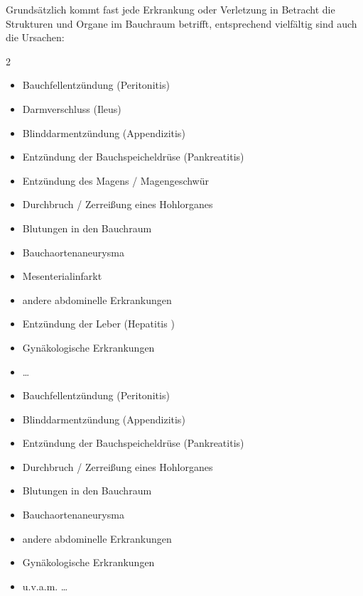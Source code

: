 {
Grundsätzlich kommt fast jede Erkrankung oder Verletzung in
Betracht die Strukturen und Organe im Bauchraum betrifft,
entsprechend vielfältig sind auch die Ursachen: 

\begin{multicols}{2}
\begin{itemize}
  \item Bauchfellentzündung (Peritonitis)
  \item Darmverschluss (Ileus)
  \item Blinddarmentzündung (Appendizitis)
  \item Entzündung der Bauchspeicheldrüse  (Pankreatitis)
  \item Entzündung des Magens / Magengeschwür
  \item Durchbruch / Zerreißung eines Hohlorganes
  \item Blutungen in den Bauchraum
  \item Bauchaortenaneurysma
  \item Mesenterialinfarkt
  \item andere abdominelle Erkrankungen
  \item Entzündung der Leber (Hepatitis )
  \item Gynäkologische Erkrankungen
  \item \ldots
\end{itemize}
\end{multicols}
}{
\begin{itemize}
  \item Bauchfellentzündung (Peritonitis)
  \item Blinddarmentzündung (Appendizitis)
  \item Entzündung der Bauchspeicheldrüse  (Pankreatitis)
  \item Durchbruch / Zerreißung eines Hohlorganes
  \item Blutungen in den Bauchraum
  \item Bauchaortenaneurysma
  \item andere abdominelle Erkrankungen
  \item Gynäkologische Erkrankungen
  \item u.v.a.m. \ldots
\end{itemize}
}{}{}{}






